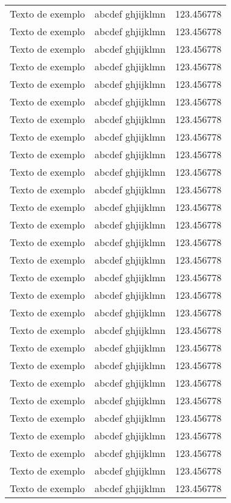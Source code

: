 \begin{longtable}{l|r|c}
  Texto de exemplo & abcdef ghjijklmn & 123.456778 \\
  Texto de exemplo & abcdef ghjijklmn & 123.456778 \\
  Texto de exemplo & abcdef ghjijklmn & 123.456778 \\
  Texto de exemplo & abcdef ghjijklmn & 123.456778 \\
  Texto de exemplo & abcdef ghjijklmn & 123.456778 \\
  Texto de exemplo & abcdef ghjijklmn & 123.456778 \\
  Texto de exemplo & abcdef ghjijklmn & 123.456778 \\
  Texto de exemplo & abcdef ghjijklmn & 123.456778 \\
  Texto de exemplo & abcdef ghjijklmn & 123.456778 \\
  Texto de exemplo & abcdef ghjijklmn & 123.456778 \\
  Texto de exemplo & abcdef ghjijklmn & 123.456778 \\
  Texto de exemplo & abcdef ghjijklmn & 123.456778 \\
  Texto de exemplo & abcdef ghjijklmn & 123.456778 \\
  Texto de exemplo & abcdef ghjijklmn & 123.456778 \\
  Texto de exemplo & abcdef ghjijklmn & 123.456778 \\
  Texto de exemplo & abcdef ghjijklmn & 123.456778 \\
  Texto de exemplo & abcdef ghjijklmn & 123.456778 \\
  Texto de exemplo & abcdef ghjijklmn & 123.456778 \\
  Texto de exemplo & abcdef ghjijklmn & 123.456778 \\
  Texto de exemplo & abcdef ghjijklmn & 123.456778 \\
  Texto de exemplo & abcdef ghjijklmn & 123.456778 \\
  Texto de exemplo & abcdef ghjijklmn & 123.456778 \\
  Texto de exemplo & abcdef ghjijklmn & 123.456778 \\
  Texto de exemplo & abcdef ghjijklmn & 123.456778 \\
  Texto de exemplo & abcdef ghjijklmn & 123.456778 \\
  Texto de exemplo & abcdef ghjijklmn & 123.456778 \\
  Texto de exemplo & abcdef ghjijklmn & 123.456778 \\
  Texto de exemplo & abcdef ghjijklmn & 123.456778 \\

\end{longtable}
